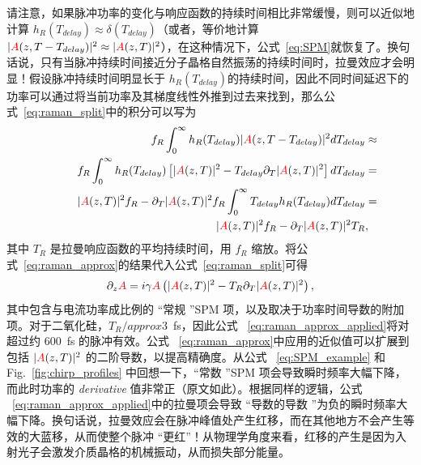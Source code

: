 请注意，如果脉冲功率的变化与响应函数的持续时间相比非常缓慢，则可以近似地计算 $h_R(T_{delay})\approx \delta(T_{delay})$（或者，等价地计算 $|\textcolor{red}{A}(z,T-T_{delay})|^2\approx|\textcolor{red}{A}(z,T)|^2$），在这种情况下，公式~\ref{eq:SPM}就恢复了。换句话说，只有当脉冲持续时间接近分子晶格自然振荡的持续时间时，拉曼效应才会明显！假设脉冲持续时间明显长于 $h_R(T_{delay})$的持续时间，因此不同时间延迟下的功率可以通过将当前功率及其梯度线性外推到过去来找到，那么公式~\ref{eq:raman_split}中的积分可以写为 
\begin{align}
\label{eq:raman_approx}
    f_R \int_{0}^{\infty} h_R(T_{delay})|\textcolor{red}{A}(z,T-T_{delay})|^2 dT_{delay} &\approx\\ \nonumber \quad\quad\quad f_R \int_{0}^{\infty} h_R(T_{delay})\left[ 
  |\textcolor{red}{A}(z,T)|^2-T_{delay}\partial_T|\textcolor{red}{A}(z,T)|^2 \right] dT_{delay} &=\\ \nonumber \quad\quad\quad  |\textcolor{red}{A}(z,T)|^2f_R- \partial_T|\textcolor{red}{A}(z,T)|^2 f_R\int_{0}^{\infty} T_{delay} h_R(T_{delay}) 
   dT_{delay}&=\\ \nonumber \quad\quad\quad  |\textcolor{red}{A}(z,T)|^2f_R- \partial_T|\textcolor{red}{A}(z,T)|^2 T_R &,
\end{align}
其中 $T_R$ 是拉曼响应函数的平均持续时间，用 $f_R$ 缩放。将公式~\ref{eq:raman_approx}的结果代入公式~\ref{eq:raman_split}可得
\begin{align}
    \label{eq:raman_approx_applied}
\partial_z \textcolor{red}{A} = i\gamma\textcolor{red}{A}\left( 
|\textcolor{red}{A}(z,T)|^2-T_R \partial_T|\textcolor{red}{A}(z,T)|^2\right),
\end{align}
其中包含与电流功率成比例的 “常规 ”SPM 项，以及取决于功率时间导数的附加项。对于二氧化硅，$T_R/approx 3$~fs，因此公式 ~\ref{eq:raman_approx_applied}将对超过约 600~fs 的脉冲有效。公式 ~\ref{eq:raman_approx}中应用的近似值可以扩展到包括 $|\textcolor{red}{A}(z,T)|^2$ 的二阶导数，以提高精确度。从公式 ~\ref{eq:SPM_example} 和 Fig.~\ref{fig:chirp_profiles} 中回想一下，“常数 ”SPM 项会导致瞬时频率大幅下降，而此时功率的 \emph{derivative} 值非常正（原文如此）。根据同样的逻辑，公式 ~\ref{eq:raman_approx_applied}中的拉曼项会导致 “导数的导数 ”为负的瞬时频率大幅下降。换句话说，拉曼效应会在脉冲峰值处产生红移，而在其他地方不会产生等效的大蓝移，从而使整个脉冲 “更红”！从物理学角度来看，红移的产生是因为入射光子会激发介质晶格的机械振动，从而损失部分能量。
